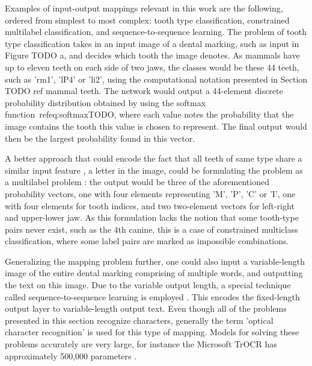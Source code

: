 \documentclass{article}
\begin{document}
Examples of input-output mappings relevant in this work are the following, 
ordered from simplest to most complex: tooth type classification, constrained multilabel classification, 
and sequence-to-sequence learning. The problem of tooth type classification takes in an input image of a dental marking,
such as input in Figure TODO a, and decides which tooth the image denotes.
As mammals have up to eleven teeth on each side of two jaws, the classes would be 
these 44 teeth, such as 'rm1', 'lP4' or 'li2', using the computational notation presented in
Section TODO ref mammal teeth. The network would output a 44-element discrete probability distribution 
obtained by using the softmax function~ref{eq:softmaxTODO}, where each value notes the probability that the image contains 
the tooth this value is chosen to represent. The final output would then be the largest probability
found in this vector.

A better approach that could encode the fact that all teeth of same type share a similar input feature
, a letter in the image, could be formulating the problem as a multilabel
problem \cite{multilabel_classification}: the output would be three of the aforementioned 
probability vectors, one with four elements representing 'M', 'P', 'C' or 'I', one with four elements 
for tooth indices, and two two-element vectors for left-right and upper-lower jaw. As this 
formulation lacks the notion that some tooth-type pairs never exist, such as the 4th canine,
this is a case of constrained multiclass classification, where some label pairs are marked 
as impossible combinations.

Generalizing the mapping problem further, one could also input a variable-length image 
of the entire dental marking comprising of multiple words, and outputting the text on this image.
Due to the variable output length, a special technique called sequence-to-sequence learning 
is employed \cite{sutskever2014sequence}. This encodes the fixed-length output layer to variable-length 
output text. Even though all of the problems presented in this section recognize characters, 
generally the term 'optical character recognition' is used for this type of mapping. Models
for solving these problems accurately are very large, for instance the Microsoft TrOCR has approximately 
500,000 parameters \cite{li2021trocr}.
\end{document}
